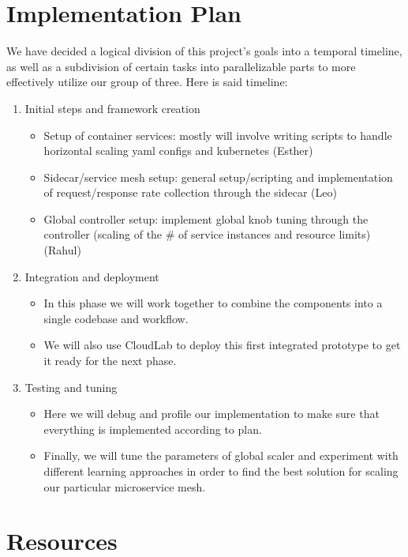 \documentclass{proposal}
\begin{document}
\section{Implementation Plan} \label{implementation}
We have decided a logical division of this project's goals into a temporal timeline, as well as a subdivision of certain tasks into parallelizable parts to more effectively utilize our group of three. Here is said timeline:
\begin{enumerate}
    \item Initial steps and framework creation
    \begin{itemize}
        \item Setup of container services: mostly will involve writing scripts to handle horizontal scaling yaml configs and kubernetes (Esther)
        \item Sidecar/service mesh setup: general setup/scripting and implementation of request/response rate collection through the sidecar (Leo)
        \item Global controller setup: implement global knob tuning through the controller (scaling of the \# of service instances and resource limits) (Rahul)
    \end{itemize}
    \item Integration and deployment
    \begin{itemize}
        \item In this phase we will work together to combine the components into a single codebase and workflow.
        \item We will also use CloudLab to deploy this first integrated prototype to get it ready for the next phase.
    \end{itemize}
    \item Testing and tuning
    \begin{itemize}
        \item Here we will debug and profile our implementation to make sure that everything is implemented according to plan.
        \item Finally, we will tune the parameters of global scaler and experiment with different learning approaches in order to find the best solution for scaling our particular microservice mesh. 
    \end{itemize}
\end{enumerate}
\section{Resources}
\end{document}
